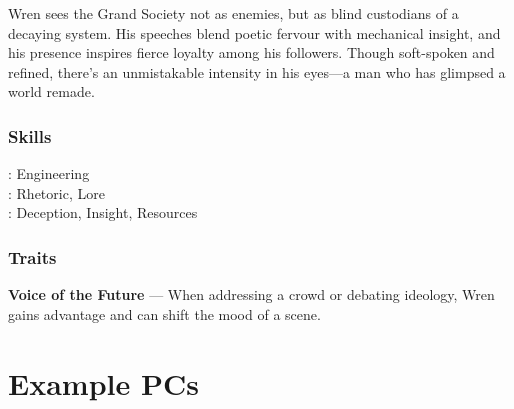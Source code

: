\begin{paracol}{3}
    Wren sees the Grand Society not as enemies, but as blind custodians of a decaying system. His speeches blend poetic fervour with mechanical insight, and his presence inspires fierce loyalty among his followers. Though soft-spoken and refined, there’s an unmistakable intensity in his eyes—a man who has glimpsed a world remade.

    \switchcolumn
    \subsubsection{Skills}
        \noindent\Expert: Engineering \\
        \noindent\Skilled: Rhetoric, Lore \\
        \noindent\Novice: Deception, Insight, Resources \\
    \subsubsection{Traits}
        \textbf{Voice of the Future} — When addressing a crowd or debating ideology, Wren gains advantage and can shift the mood of a scene. \\

    \end{paracol}

\newpage
\section{Example PCs}

